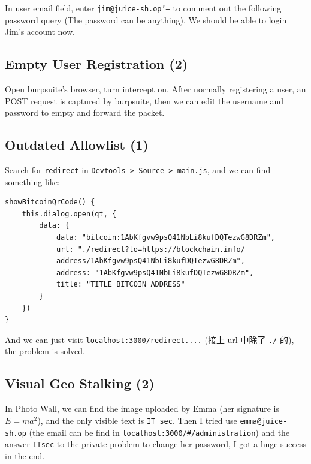 \documentclass[12pt]{article}
\begin{document}
In user email field, enter \texttt{jim@juice-sh.op'--} to comment out the following password query (The password can be anything). We should be able to login Jim's account now.

\subsection{Empty User Registration (2)}
Open burpsuite's browser, turn intercept on. After normally registering a user, an POST request is captured by burpsuite, then we can edit the username and password to empty and forward the packet.

\subsection{Outdated Allowlist (1)}
Search for \texttt{redirect} in \texttt{Devtools > Source > main.js}, and we can find something like:
\begin{Verbatim}[breaklines,linenos]
showBitcoinQrCode() {
    this.dialog.open(qt, {
        data: {
            data: "bitcoin:1AbKfgvw9psQ41NbLi8kufDQTezwG8DRZm",
            url: "./redirect?to=https://blockchain.info/
            address/1AbKfgvw9psQ41NbLi8kufDQTezwG8DRZm",
            address: "1AbKfgvw9psQ41NbLi8kufDQTezwG8DRZm",
            title: "TITLE_BITCOIN_ADDRESS"
        }
    })
}
\end{Verbatim}
And we can just visit \texttt{localhost:3000/redirect....} (接上 url 中除了 \texttt{./} 的), the problem is solved.
\subsection{Visual Geo Stalking (2)}
In Photo Wall, we can find the image uploaded by Emma (her signature is $E=ma^2$), and the only visible text is \texttt{IT sec}. Then I tried use \texttt{emma@juice-sh.op} (the email can be find in \texttt{localhost:3000/\#/administration}) and the answer \texttt{ITsec} to the private problem to change her password, I got a huge success in the end.
\end{document}

